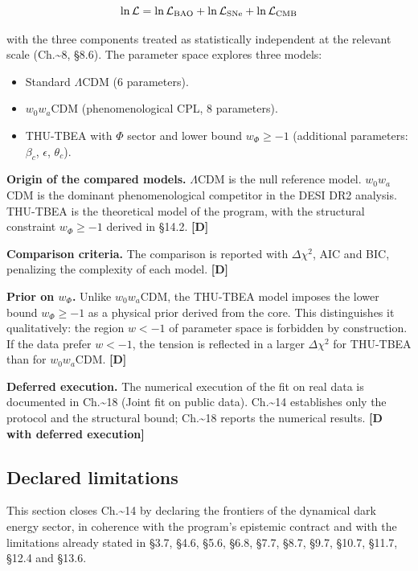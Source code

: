 ﻿\documentclass[11pt,letterpaper]{article}
\begin{document}
\begin{equation*}
  \resizebox{\ifdim\width>\linewidth \linewidth\else\width\fi}{!}{$\displaystyle \ln\mathcal{L} = \ln\mathcal{L}_{\text{BAO}} + \ln\mathcal{L}_{\text{SNe}} + \ln\mathcal{L}_{\text{CMB}}$}
\end{equation*}

with the three components treated as statistically independent at the relevant scale (Ch.\textasciitilde{}8, §8.6). The parameter space explores three models:

\begin{itemize}[leftmargin=*]
\item Standard $\Lambda$CDM (6 parameters).
\item $w_0w_a$CDM (phenomenological CPL, 8 parameters).
\item THU-TBEA with $\Phi$ sector and lower bound $w_\Phi \geq -1$ (additional parameters: $\beta_c$, $\epsilon$, $\theta_c$).
\end{itemize}

\textbf{Origin of the compared models.} $\Lambda$CDM is the null reference model. $w_0w_a$CDM is the dominant phenomenological competitor in the DESI DR2 analysis. THU-TBEA is the theoretical model of the program, with the structural constraint $w_\Phi \geq -1$ derived in §14.2. \textbf{[D]}

\textbf{Comparison criteria.} The comparison is reported with $\Delta\chi^2$, AIC and BIC, penalizing the complexity of each model. \textbf{[D]}

\textbf{Prior on $w_\Phi$.} Unlike $w_0w_a$CDM, the THU-TBEA model imposes the lower bound $w_\Phi \geq -1$ as a physical prior derived from the core. This distinguishes it qualitatively: the region $w < -1$ of parameter space is forbidden by construction. If the data prefer $w < -1$, the tension is reflected in a larger $\Delta\chi^2$ for THU-TBEA than for $w_0w_a$CDM. \textbf{[D]}

\textbf{Deferred execution.} The numerical execution of the fit on real data is documented in Ch.\textasciitilde{}18 (Joint fit on public data). Ch.\textasciitilde{}14 establishes only the protocol and the structural bound; Ch.\textasciitilde{}18 reports the numerical results. \textbf{[D with deferred execution]}
\subsection{Declared limitations}
This section closes Ch.\textasciitilde{}14 by declaring the frontiers of the dynamical dark energy sector, in coherence with the program's epistemic contract and with the limitations already stated in §3.7, §4.6, §5.6, §6.8, §7.7, §8.7, §9.7, §10.7, §11.7, §12.4 and §13.6.
\end{document}
